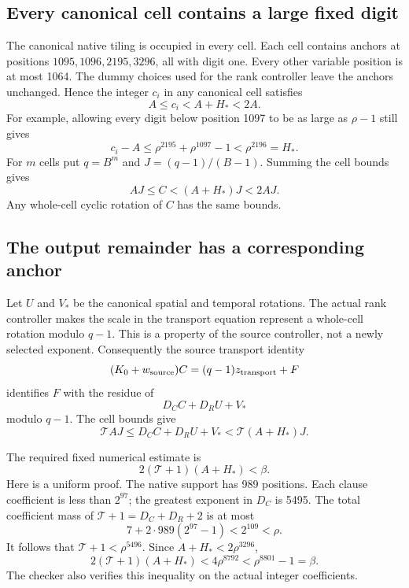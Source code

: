 \documentclass[11pt]{article}
\theoremstyle{remark}\newtheorem{remark}[theorem]{Remark}
\begin{document}
\subsection{Every canonical cell contains a large fixed digit}

The canonical native tiling is occupied in every cell. Each cell contains anchors at positions $1095,1096,2195,3296$, all with digit one. Every other variable position is at most 1064. The dummy choices used for the rank controller leave the anchors unchanged. Hence the integer $c_i$ in any canonical cell satisfies
\[
 A\le c_i<A+H_*<2A.
\]
For example, allowing every digit below position 1097 to be as large as $\rho-1$ still gives
\[
 c_i-A\le\rho^{2195}+\rho^{1097}-1<\rho^{2196}=H_*.
\]
For $m$ cells put $q=B^m$ and $J=(q-1)/(B-1)$. Summing the cell bounds gives
\begin{equation}\label{eq:Cbounds}
 AJ\le C<(A+H_*)J<2AJ.
\end{equation}
Any whole-cell cyclic rotation of $C$ has the same bounds.

\subsection{The output remainder has a corresponding anchor}

Let $U$ and $V_*$ be the canonical spatial and temporal rotations. The actual rank controller makes the scale in the transport equation represent a whole-cell rotation modulo $q-1$. This is a property of the source controller, not a newly selected exponent. Consequently the source transport identity
\[
 (K_0+w_{\rm source})C=(q-1)z_{\rm transport}+F
\]
identifies $F$ with the residue of
\[
 D_C C+D_R U+V_*
\]
modulo $q-1$. The cell bounds give
\begin{equation}\label{eq:Fboundsraw}
 \mathcal T AJ\le D_C C+D_RU+V_*<\mathcal T(A+H_*)J.
\end{equation}

The required fixed numerical estimate is
\begin{equation}\label{eq:fixedbound}
 2(\mathcal T+1)(A+H_*)<\beta.
\end{equation}
Here is a uniform proof. The native support has 989 positions. Each clause coefficient is less than $2^{97}$; the greatest exponent in $D_C$ is 5495. The total coefficient mass of $\mathcal T+1=D_C+D_R+2$ is at most
\[
 7+2\cdot989(2^{97}-1)<2^{109}<\rho.
\]
It follows that $\mathcal T+1<\rho^{5496}$. Since $A+H_*<2\rho^{3296}$,
\[
 2(\mathcal T+1)(A+H_*)<4\rho^{8792}<\rho^{8801}-1=\beta.
\]
The checker also verifies this inequality on the actual integer coefficients.
\end{document}
